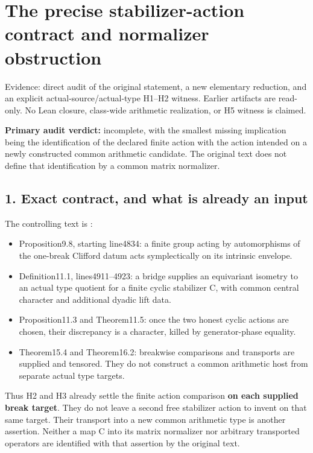 \clearpage
\section{The precise stabilizer-action contract and normalizer obstruction}\label{app:stabilizer_contract}

Evidence: direct audit of the original statement, a new elementary
reduction, and an explicit actual-source/actual-type H1--H2 witness.
Earlier artifacts are read-only. No Lean closure, class-wide arithmetic
realization, or H5 witness is claimed.

\textbf{Primary audit verdict:} incomplete, with the smallest missing
implication being the identification of the declared finite action with
the action intended on a newly constructed common arithmetic candidate.
The original text does not define that identification by a common matrix
normalizer.

\hypertarget{stabilizer_contract-exact-contract-and-what-is-already-an-input}{%
\subsection{1. Exact contract, and what is already an
input}\label{stabilizer_contract-exact-contract-and-what-is-already-an-input}}

The controlling text is
:

\begin{itemize}
\tightlist
\item
  Proposition9.8, starting line4834: a finite group acting by
  automorphisms of the one-break Clifford datum acts symplectically on
  its intrinsic envelope.
\item
  Definition11.1, lines4911--4923: a bridge supplies an equivariant
  isometry to an actual type quotient for a finite cyclic stabilizer C,
  with common central character and additional dyadic lift data.
\item
  Proposition11.3 and Theorem11.5: once the two honest cyclic actions
  are chosen, their discrepancy is a character, killed by
  generator-phase equality.
\item
  Theorem15.4 and Theorem16.2: breakwise comparisons and transports are
  supplied and tensored. They do not construct a common arithmetic host
  from separate actual type targets.
\end{itemize}

Thus H2 and H3 already settle the finite action comparison \textbf{on
each supplied break target}. They do not leave a second free stabilizer
action to invent on that same target. Their transport into a new common
arithmetic type is another assertion. Neither a map C into its matrix
normalizer nor arbitrary transported operators are identified with that
assertion by the original text.

